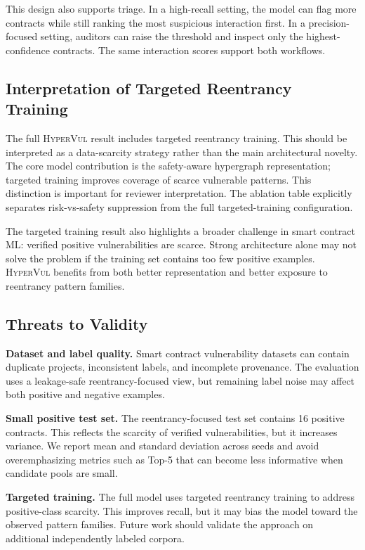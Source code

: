 \documentclass[conference]{IEEEtran}
\newcommand{\tool}{\textsc{HyperVul}}
\begin{document}
This design also supports triage. In a high-recall setting, the model can flag more contracts while still ranking the most suspicious interaction first. In a precision-focused setting, auditors can raise the threshold and inspect only the highest-confidence contracts. The same interaction scores support both workflows.

\subsection{Interpretation of Targeted Reentrancy Training}

The full \tool{} result includes targeted reentrancy training. This should be interpreted as a data-scarcity strategy rather than the main architectural novelty. The core model contribution is the safety-aware hypergraph representation; targeted training improves coverage of scarce vulnerable patterns. This distinction is important for reviewer interpretation. The ablation table explicitly separates risk-vs-safety suppression from the full targeted-training configuration.

The targeted training result also highlights a broader challenge in smart contract ML: verified positive vulnerabilities are scarce. Strong architecture alone may not solve the problem if the training set contains too few positive examples. \tool{} benefits from both better representation and better exposure to reentrancy pattern families.

\subsection{Threats to Validity}

\textbf{Dataset and label quality.} Smart contract vulnerability datasets can contain duplicate projects, inconsistent labels, and incomplete provenance. The evaluation uses a leakage-safe reentrancy-focused view, but remaining label noise may affect both positive and negative examples.

\textbf{Small positive test set.} The reentrancy-focused test set contains 16 positive contracts. This reflects the scarcity of verified vulnerabilities, but it increases variance. We report mean and standard deviation across seeds and avoid overemphasizing metrics such as Top-5 that can become less informative when candidate pools are small.

\textbf{Targeted training.} The full model uses targeted reentrancy training to address positive-class scarcity. This improves recall, but it may bias the model toward the observed pattern families. Future work should validate the approach on additional independently labeled corpora.
\end{document}
